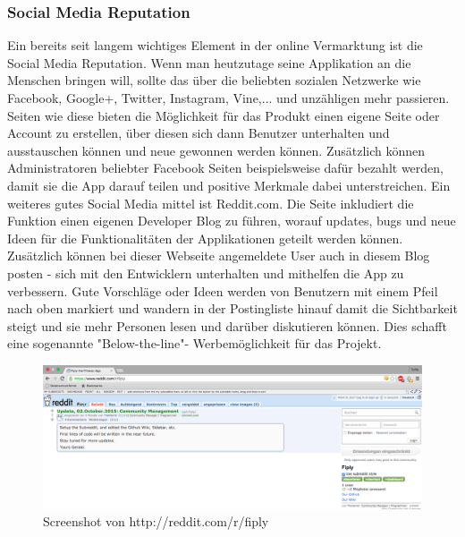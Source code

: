 \documentclass[FIPLY_base.tex]{subfiles}
\begin{document}
\subsubsection{Social Media Reputation}
Ein bereits seit langem wichtiges Element in der online Vermarktung ist die Social Media Reputation. Wenn man heutzutage seine Applikation an die Menschen bringen will, sollte das über die beliebten sozialen Netzwerke wie Facebook, Google+, Twitter, Instagram, Vine,... und unzähligen mehr passieren. Seiten wie diese bieten die Möglichkeit für das Produkt einen eigene Seite oder Account zu erstellen, über diesen sich dann Benutzer unterhalten und ausstauschen können und neue gewonnen werden können. Zusätzlich können Administratoren beliebter Facebook Seiten beispielsweise dafür bezahlt werden, damit sie die App darauf teilen und positive Merkmale dabei unterstreichen. 
\newline
Ein weiteres gutes Social Media mittel ist Reddit.com. Die Seite inkludiert die Funktion einen eigenen Developer Blog zu führen, worauf updates, bugs und neue Ideen für die Funktionalitäten der Applikationen geteilt werden können. Zusätzlich können bei dieser Webseite angemeldete User auch in diesem Blog posten - sich mit den Entwicklern unterhalten und mithelfen die App zu verbessern. Gute Vorschläge oder Ideen werden von Benutzern mit einem Pfeil nach oben markiert und wandern in der Postingliste hinauf damit die Sichtbarkeit steigt und sie mehr Personen lesen und darüber diskutieren können. Dies schafft eine sogenannte "Below-the-line"- Werbemöglichkeit für das Projekt.

\begin{figure}[H]
	\centering
	\includegraphics[scale=0.28]{img/fiplysubredditscreenshot}
	\caption{Screenshot von http://reddit.com/r/fiply}
\end{figure}
\end{document}
